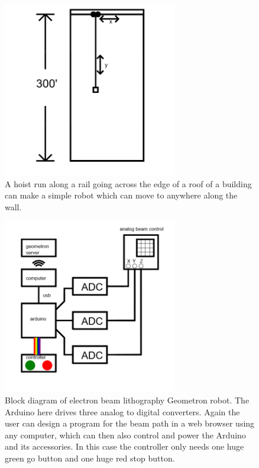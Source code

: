 \begin{figure}
	\centering
	\includegraphics[width=3in]{figures/machines/buildingwallrobot.png}
	\caption[buildingwallrobot]
	{A hoist run along a rail going across the edge of a roof of a building can make a simple robot which can move to anywhere along the wall.}
\end{figure}

\begin{figure}
	\centering
	\includegraphics[width=3in]{figures/machines/eblblockdiagram.png}
	\caption[eblblockdiagram]
	{Block diagram of electron beam lithography Geometron robot.  The Arduino here drives three analog to digital converters.  Again the user can design a program for the beam path in a web browser using any computer, which can then also control and power the Arduino and its accessories.  In this case the controller only needs one huge green go button and one huge red stop button.}
\end{figure}



